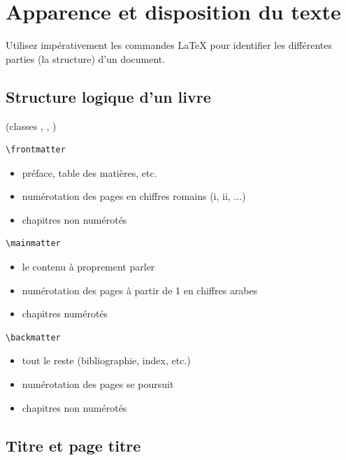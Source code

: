 \chapter{Apparence et disposition du texte}
\label{chap:apparence}


\begin{conseil}
  Utilisez impérativement les commandes {\LaTeX} pour identifier
  les différentes parties (la structure) d'un document.
\end{conseil}

\section{Structure logique d'un livre}

(classes , , )

\begin{lstlisting}
\frontmatter
\end{lstlisting}
\begin{itemize}
\item préface, table des matières, etc.
\item numérotation des pages en chiffres romains (i, ii, ...)
\item chapitres non numérotés
\end{itemize}

\begin{lstlisting}
\mainmatter
\end{lstlisting}
\begin{itemize}
\item le contenu à proprement parler
\item numérotation des pages à partir de 1 en chiffres arabes
\item chapitres numérotés
\end{itemize}

\begin{lstlisting}
\backmatter
\end{lstlisting}
\begin{itemize}
\item tout le reste (bibliographie, index, etc.)
\item numérotation des pages se poursuit
\item chapitres non numérotés
\end{itemize}


\section{Titre et page titre}

